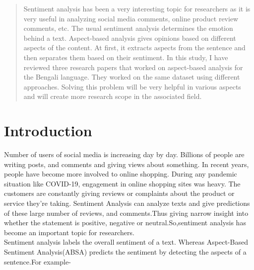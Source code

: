 \documentclass[a4paper,12pt]{article}
\begin{document}
\setcounter{page}{1}
\begin{abstract}
Sentiment analysis has been a very interesting topic for researchers as it is very useful in analyzing social media comments, online product review comments, etc. The usual sentiment analysis determines the emotion behind a text. Aspect-based analysis gives opinions based on different aspects of the content. At first, it extracts aspects from the sentence and then separates them based on their sentiment. In this study, I have reviewed three research papers that worked on aspect-based analysis for the Bengali language. They worked on the same dataset using different approaches. Solving this problem will be very helpful in various aspects and will create more research scope in the associated field.
\end{abstract}
\newpage

\setcounter{page}{2}
\tableofcontents
\newpage


\setcounter{page}{4}
\listoftables
\newpage

\setcounter{page}{5}
\listoffigures
\newpage

\clearpage


\section{Introduction}
Number of users of social media is increasing day by day. Billions of people are writing posts, and comments and giving views about something. In recent years, people have become more involved to online shopping. During any pandemic situation like COVID-19, engagement in online shopping sites was heavy. The customers are constantly giving reviews or complaints about the product or service they're taking. Sentiment Analysis can analyze texts and give predictions of these large number of reviews, and comments.Thus giving narrow insight into whether the statement is positive, negative or neutral.So,sentiment analysis has become an important topic for researchers.\\[1\baselineskip]
Sentiment analysis labels the overall sentiment of a text. Whereas Aspect-Based Sentiment Analysis(ABSA) predicts the sentiment by detecting the aspects of a sentence.For example-\vspace{1em}
 
\end{document}
